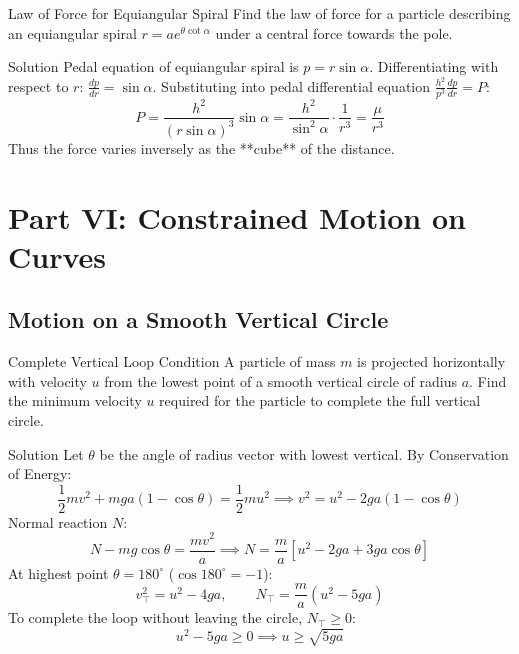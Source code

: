 \documentclass[11pt,a4paper]{article}
\begin{document}
\begin{examplebox}{Law of Force for Equiangular Spiral}
Find the law of force for a particle describing an equiangular spiral $r = a e^{\theta\cot\alpha}$ under a central force towards the pole.
\end{examplebox}

\begin{proofbox}{Solution}
Pedal equation of equiangular spiral is $p = r\sin\alpha$.
Differentiating with respect to $r$: $\frac{dp}{dr} = \sin\alpha$.
Substituting into pedal differential equation $\frac{h^2}{p^3}\frac{dp}{dr} = P$:
\[
P = \frac{h^2}{(r\sin\alpha)^3} \sin\alpha = \frac{h^2}{\sin^2\alpha} \cdot \frac{1}{r^3} = \frac{\mu}{r^3}
\]
Thus the force varies inversely as the **cube** of the distance.
\end{proofbox}

\section{Part VI: Constrained Motion on Curves}

\subsection{Motion on a Smooth Vertical Circle}

\begin{examplebox}{Complete Vertical Loop Condition}
A particle of mass $m$ is projected horizontally with velocity $u$ from the lowest point of a smooth vertical circle of radius $a$. Find the minimum velocity $u$ required for the particle to complete the full vertical circle.
\end{examplebox}

\begin{proofbox}{Solution}
Let $\theta$ be the angle of radius vector with lowest vertical.
By Conservation of Energy:
\[
\frac{1}{2}m v^2 + mga(1 - \cos\theta) = \frac{1}{2}m u^2 \implies v^2 = u^2 - 2ga(1 - \cos\theta)
\]
Normal reaction $N$:
\[
N - mg\cos\theta = \frac{m v^2}{a} \implies N = \frac{m}{a}\left[u^2 - 2ga + 3ga\cos\theta\right]
\]
At highest point $\theta = 180^\circ$ ($\cos 180^\circ = -1$):
\[
v_{\top}^2 = u^2 - 4ga, \qquad N_{\top} = \frac{m}{a}(u^2 - 5ga)
\]
To complete the loop without leaving the circle, $N_{\top} \ge 0$:
\[
u^2 - 5ga \ge 0 \implies u \ge \sqrt{5ga}
\]
\end{proofbox}
\end{document}
